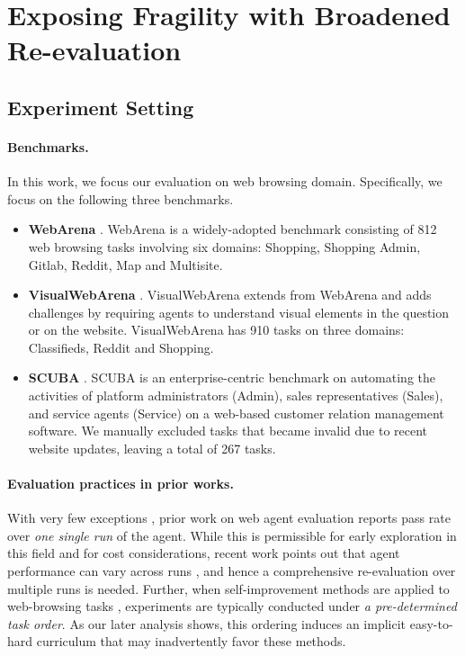 \documentclass{article}
\begin{document}
\section{Exposing Fragility with Broadened Re-evaluation}
\label{sec:exposing-fragility}

\subsection{Experiment Setting}
\label{ssec:experiments}
\paragraph{Benchmarks.} In this work, we focus our evaluation on web browsing domain. Specifically, we focus on the following three benchmarks.
\begin{itemize}[leftmargin=2em, topsep=0pt, parsep=0pt]
    \item \textbf{WebArena} \citep{zhou2024webarena}. WebArena is a widely-adopted benchmark consisting of 812 web browsing tasks involving six domains: Shopping, Shopping Admin, Gitlab, Reddit, Map and Multisite. 
    \item \textbf{VisualWebArena} \citep{koh-etal-2024-visualwebarena}. VisualWebArena extends from WebArena and adds challenges by requiring agents to understand visual elements in the question or on the website. VisualWebArena has 910 tasks on three domains: Classifieds, Reddit and Shopping.
    \item \textbf{SCUBA} \citep{dai2025scubasalesforcecomputeruse}. SCUBA is an enterprise-centric benchmark on automating the activities of platform administrators (Admin), sales representatives (Sales), and service agents (Service) on a web-based customer relation management software. We manually excluded tasks that became invalid due to recent website updates, leaving a total of 267 tasks.
\end{itemize}


\paragraph{Evaluation practices in prior works.}
With very few exceptions \cite{yu2026polyskill,hattami2025webarena}, prior work on web agent evaluation reports pass rate over \textit{one single run} of the agent. While this is permissible for early exploration in this field and for cost considerations, recent work points out that agent performance can vary across runs \cite{yao2024taubenchbenchmarktoolagentuserinteraction,rabanser2026scienceaiagentreliability}, and hence a comprehensive re-evaluation over multiple runs is needed.
Further, when self-improvement methods are applied to web-browsing tasks \cite{wang2025agent,ouyang2025reasoningbankscalingagentselfevolving}, experiments are typically conducted under \textit{a pre-determined task order}. As our later analysis shows, this ordering induces an implicit easy-to-hard curriculum that may inadvertently favor these methods.
\end{document}
